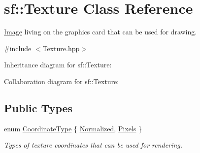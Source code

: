 \hypertarget{classsf_1_1_texture}{}\section{sf\+:\+:Texture Class Reference}
\label{classsf_1_1_texture}


\hyperlink{classsf_1_1_image}{Image} living on the graphics card that can be used for drawing.  




{\ttfamily \#include $<$Texture.\+hpp$>$}



Inheritance diagram for sf\+:\+:Texture\+:


Collaboration diagram for sf\+:\+:Texture\+:
\subsection*{Public Types}
\begin{DoxyCompactItemize}
\item 
enum \hyperlink{classsf_1_1_texture_aa6fd3bbe3c334b3c4428edfb2765a82e}{Coordinate\+Type} \{ \hyperlink{classsf_1_1_texture_aa6fd3bbe3c334b3c4428edfb2765a82ea69d6228950882e4d68be4ba4dbe7df73}{Normalized}, 
\hyperlink{classsf_1_1_texture_aa6fd3bbe3c334b3c4428edfb2765a82ea6372f9c3a10203a7a69d8d5da59d82ff}{Pixels}
 \}\begin{DoxyCompactList}\small\item\em Types of texture coordinates that can be used for rendering. \end{DoxyCompactList}
\end{DoxyCompactItemize}
